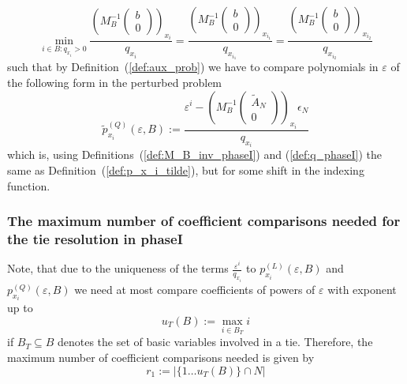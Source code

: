 \documentclass[a4paper]{article}
\begin{document}
\begin{equation*}
\min_{i \in B: q_{x_{i}}>0}
\frac{
\left(M_{B}^{-1}
  \left(\begin{array}{c}
          b \\
	  \hline
	  0
        \end{array}
  \right)
\right)_{x_{i}}
}{q_{x_{i}}}
=
\frac{
\left(M_{B}^{-1}
  \left(\begin{array}{c}
          b \\
	  \hline
	  0
        \end{array}
  \right)
\right)_{x_{i_{1}}}
}{q_{x_{i_{1}}}}
=
\frac{
\left(M_{B}^{-1}
  \left(\begin{array}{c}
          b \\
	  \hline
	  0
        \end{array}
  \right)
\right)_{x_{i_{2}}}
}{q_{x_{i_{2}}}}
\end{equation*}
such that by Definition~(\ref{def:aux_prob}) we have to compare polynomials
in $\varepsilon$ of the following form in the perturbed problem
\begin{equation}
\label{def:p_x_i_tilde_Q_1}
\tilde{p}_{x_{i}}^{(Q)}\left(\varepsilon, B\right) :=
\frac{
 \varepsilon^{i}
 -\left(M_{B}^{-1}
   \left(\begin{array}{c}
           \tilde{A}_{N} \\
	   \hline
	    0
         \end{array}
   \right)
  \right)_{x_{i}}
 \epsilon_{N}
}{q_{x_{i}}}
\end{equation}
which is, using Definitions~(\ref{def:M_B_inv_phaseI}) and
(\ref{def:q_phaseI}) the same as
Definition~(\ref{def:p_x_i_tilde}),
but for some shift in the indexing function.

\subsubsection{The maximum number of coefficient comparisons needed for the tie
resolution in phaseI}
Note, that due to the uniqueness of the terms
$\frac{\varepsilon^{i}}{q_{x_{i}}}$ to
$p_{x_{i}}^{(L)}(\varepsilon, B)$ and
$p_{x_{i}}^{(Q)}(\varepsilon, B)$
we need at most compare coefficients of
powers of $\varepsilon$ with exponent up to
\begin{equation}
\label{def:u_T}
u_{T}(B):=\max_{i \in B_{T}} i
\end{equation}
if $B_{T} \subseteq B$ denotes the set of basic variables involved in a tie.
Therefore, the maximum number of coefficient comparisons needed is given by
\begin{equation}
r_{1}:=\left|\{1 \ldots u_{T}(B)\} \cap N\right|
\end{equation} 
 
\end{document}
